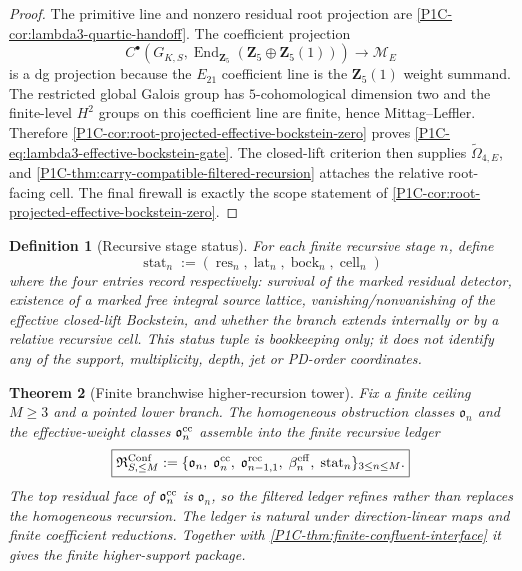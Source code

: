 \documentclass[11pt]{article}
\newtheorem{theorem}{Theorem}[section]
\newtheorem{definition}[theorem]{Definition}
\theoremstyle{remark}
\newcommand{\Z}{\mathbf Z}
\begin{document}
\begin{proof}
The primitive line and nonzero residual root projection are
\cref{P1C-cor:lambda3-quartic-handoff}.  The coefficient projection
\[
 C^\bullet(G_{K,S},\operatorname{End}_{\Z_5}(\Z_5\oplus\Z_5(1)))
 \longrightarrow \mathscr M_E
\]
is a dg projection because the $E_{21}$ coefficient line is the $\Z_5(1)$ weight summand.  The restricted global Galois group has $5$-cohomological dimension two and the finite-level $H^2$ groups on this coefficient line are finite, hence Mittag--Leffler.  Therefore \cref{P1C-cor:root-projected-effective-bockstein-zero} proves
\eqref{P1C-eq:lambda3-effective-bockstein-gate}.  The closed-lift criterion then supplies
$\widetilde\Omega_{4,E}$, and \cref{P1C-thm:carry-compatible-filtered-recursion} attaches the relative
root-facing cell.  The final firewall is exactly the scope statement of
\cref{P1C-cor:root-projected-effective-bockstein-zero}.
\end{proof}

\begin{definition}[Recursive stage status]\label{P1C-def:recursive-stage-status}
For each finite recursive stage $n$, define
\[
 \operatorname{stat}_n
 :=(\operatorname{res}_n,\operatorname{lat}_n,
    \operatorname{bock}_n,\operatorname{cell}_n)
\]
where the four entries record respectively: survival of the marked residual detector, existence of a marked free integral source lattice, vanishing/nonvanishing of the effective closed-lift Bockstein, and whether the branch extends internally or by a relative recursive cell.  This status tuple is bookkeeping only; it does not identify any of the support, multiplicity, depth, jet or PD-order coordinates.
\end{definition}

\begin{theorem}[Finite branchwise higher-recursion tower]
\label{P1C-thm:finite-branchwise-higher-recursion}
Fix a finite ceiling $M\ge3$ and a pointed lower branch.  The homogeneous obstruction classes
$\mathfrak o_n$ and the effective-weight classes $\mathfrak o_n^{\rm cc}$ assemble into the finite
recursive ledger
\[
 \boxed{
 \mathfrak R^{\rm Conf}_{S,\le M}
 :=\{\mathfrak o_n,\;\mathfrak o_n^{\rm cc},\;
       \mathfrak o^{\rm rec}_{n-1,1},\;
       \beta_n^{\rm eff},\;\operatorname{stat}_n\}_{3\le n\le M}.}
\]
The top residual face of $\mathfrak o_n^{\rm cc}$ is $\mathfrak o_n$, so the filtered ledger refines
rather than replaces the homogeneous recursion.  The ledger is natural under direction-linear maps
and finite coefficient reductions.  Together with
\cref{P1C-thm:finite-confluent-interface} it gives the finite higher-support package.
\end{theorem}
\end{document}
